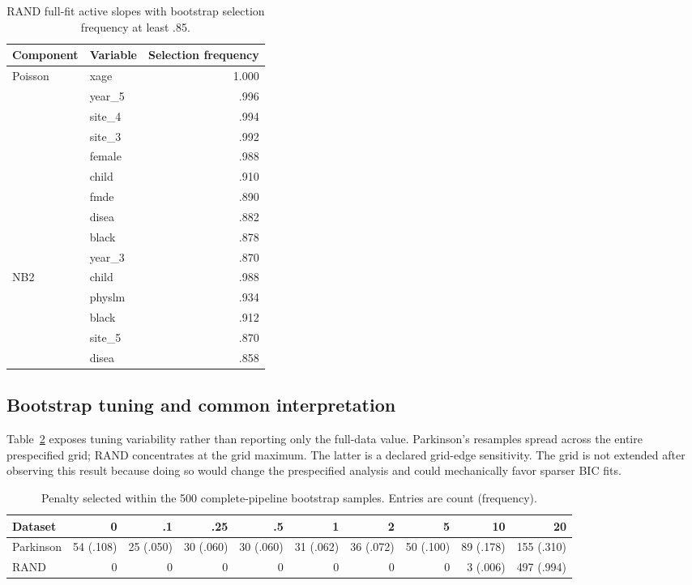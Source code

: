 \documentclass[a4paper,fleqn]{cas-sc}
\numberwithin{equation}{section}
\begin{document}
\begin{table}[t]
\centering
\caption{RAND full-fit active slopes with bootstrap selection frequency at least .85.}
\label{supp:tab:stable-rand}
\small
\begin{tabular}{llr}
\toprule
Component & Variable & Selection frequency\\
\midrule
Poisson & xage & 1.000\\
 & year\_5 & .996\\
 & site\_4 & .994\\
 & site\_3 & .992\\
 & female & .988\\
 & child & .910\\
 & fmde & .890\\
 & disea & .882\\
 & black & .878\\
 & year\_3 & .870\\
NB2 & child & .988\\
 & physlm & .934\\
 & black & .912\\
 & site\_5 & .870\\
 & disea & .858\\
\bottomrule
\end{tabular}
\end{table}

\subsection{Bootstrap tuning and common interpretation}

Table~\ref{supp:tab:lambda-bootstrap} exposes tuning variability rather than reporting only the full-data value. Parkinson's resamples spread across the entire prespecified grid; RAND concentrates at the grid maximum. The latter is a declared grid-edge sensitivity. The grid is not extended after observing this result because doing so would change the prespecified analysis and could mechanically favor sparser BIC fits.

\begin{table}[t]
\centering
\caption{Penalty selected within the 500 complete-pipeline bootstrap samples. Entries are count (frequency).}
\label{supp:tab:lambda-bootstrap}
\scriptsize
\setlength{\tabcolsep}{3pt}
\begin{tabular}{lrrrrrrrrr}
\toprule
Dataset & 0 & .1 & .25 & .5 & 1 & 2 & 5 & 10 & 20\\
\midrule
Parkinson & 54 (.108) & 25 (.050) & 30 (.060) & 30 (.060) &
31 (.062) & 36 (.072) & 50 (.100) & 89 (.178) & 155 (.310)\\
RAND & 0 & 0 & 0 & 0 & 0 & 0 & 0 & 3 (.006) & 497 (.994)\\
\bottomrule
\end{tabular}
\end{table}
\end{document}

